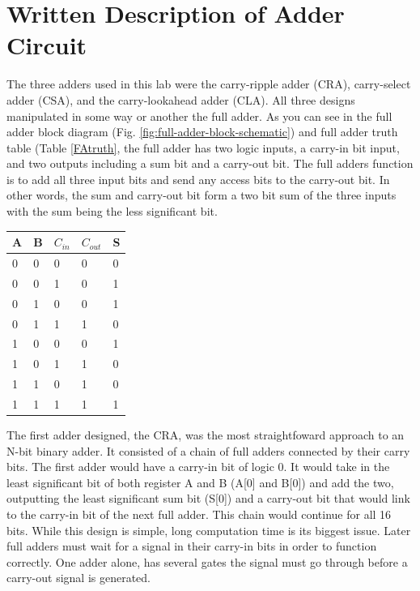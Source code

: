 \documentclass[journal, twocolumn, final,11pt,letterpaper]{IEEEtran}
\begin{document}
\section{Written Description of Adder Circuit}
The three adders used in this lab were the carry-ripple adder (CRA), carry-select adder (CSA), and the carry-lookahead adder (CLA).  All three designs manipulated in some way or another the full adder.  As you can see in the full adder block diagram (Fig. \ref{fig:full-adder-block-schematic}) and full adder truth table (Table \ref{FAtruth}, the full adder has two logic inputs, a carry-in bit input, and two outputs including a sum bit and a carry-out bit.  The full adders function is to add all three input bits and send any access bits to the carry-out bit.  In other words, the sum and carry-out bit form a two bit sum of the three inputs with the sum being the less significant bit.     
\begin{center}
	\begin{tabular}{lll|ll}
		A & B &$C_{in}$& $C_{out}$& S \\ \hline
		0 & 0 & 0      & 0 & 0\\
		0 & 0 & 1      & 0 & 1\\
		0 & 1 & 0      & 0 & 1\\
		0 & 1 & 1      & 1 & 0\\
		1 & 0 & 0      & 0 & 1\\
		1 & 0 & 1      & 1 & 0\\
		1 & 1 & 0      & 1 & 0\\
		1 & 1 & 1      & 1 & 1\\		
	\end{tabular}
	\label{FAtruth}
\end{center}
The first adder designed, the CRA,  was the most straightfoward approach to an N-bit binary adder.  It consisted of a chain of full adders connected by their carry bits. The first adder would have a carry-in bit of logic 0.  It would take in the least significant bit of both register A and B (A[0] and B[0]) and add the two, outputting the least significant sum bit (S[0]) and a carry-out bit that would link to the carry-in bit of the next full adder.  This chain would continue for all 16 bits.  While this design is simple, long computation time is its biggest issue.  Later full adders must wait for a signal in their carry-in bits in order to function correctly.  One adder alone, has several gates the signal must go through before a carry-out signal is generated.  
\end{document}
